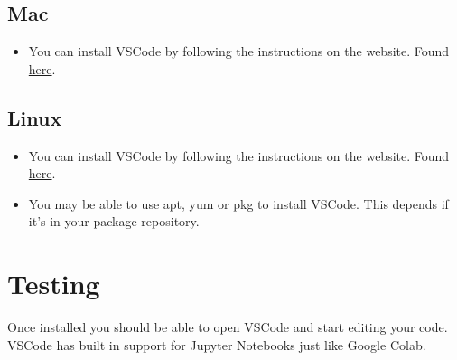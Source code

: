 \documentclass[11pt]{report}
\begin{document}
    \section{Mac}
    \begin{itemize}
        \item You can install VSCode by following the instructions on the website. Found \href{https://code.visualstudio.com/docs/setup/mac}{here}.
    \end{itemize}

    \section{Linux}
        \begin{itemize}
            \item You can install VSCode by following the instructions on the website. Found \href{https://code.visualstudio.com/docs/setup/linux}{here}.
            \item You may be able to use apt, yum or pkg to install VSCode. This depends if it's in your package repository.
        \end{itemize}

    \chapter{Testing}

    Once installed you should be able to open VSCode and start editing your code. VSCode has built in support for Jupyter Notebooks just like Google Colab.
\end{document}
